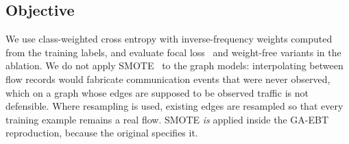 \subsection{Objective}

We use class-weighted cross entropy with inverse-frequency weights computed
from the training labels, and evaluate focal loss~\cite{lin2017focal} and
weight-free variants in the ablation. We do not apply
SMOTE~\cite{chawla2002smote} to the graph models: interpolating between flow
records would fabricate communication events that were never observed, which on
a graph whose edges are supposed to be observed traffic is not defensible. Where
resampling is used, existing edges are resampled so that every training example
remains a real flow. SMOTE \emph{is} applied inside the GA-EBT reproduction,
because the original specifies it.
